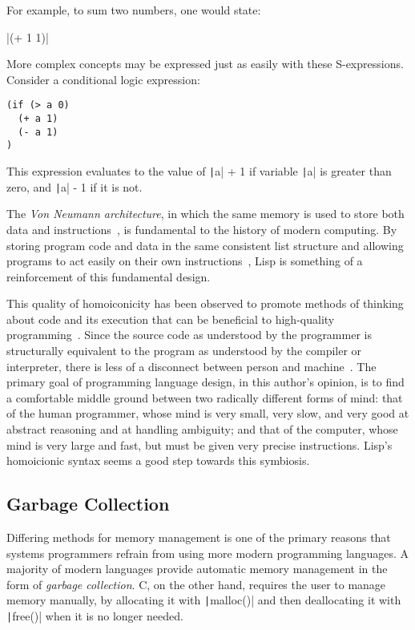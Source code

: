 \documentclass[11pt,a4paper]{article}
\theoremstyle{break}
\begin{document}
For example, to sum two numbers, one would state:

\begin{center}
|(+ 1 1)|
\end{center}

More complex concepts may be expressed just as easily with these S-expressions. Consider a conditional logic expression:

{\centering
\begin{verbatim}
(if (> a 0)
  (+ a 1)
  (- a 1)
)
\end{verbatim}\par
}

This expression evaluates to the value of \texttt|a| + 1 if variable \texttt|a| is greater than zero, and \texttt|a| - 1 if it is not.

The \textit{Von Neumann architecture}, in which the same memory is used to store both data and instructions~\cite{von1993first}, is fundamental to the history of modern computing. By storing program code and data in the same consistent list structure and allowing programs to act easily on their own instructions~\cite{Smith:1984:RSL:800017.800513}, Lisp is something of a reinforcement of this fundamental design.

This quality of homoiconicity has been observed to promote methods of thinking about code and its execution that can be beneficial to high-quality programming~\cite{sicp,raymond2003become}. Since the source code as understood by the programmer is structurally equivalent to the program as understood by the compiler or interpreter, there is less of a disconnect between person and machine~\cite{sicp}. The primary goal of programming language design, in this author's opinion, is to find a comfortable middle ground between two radically different forms of mind: that of the human programmer, whose mind is very small, very slow, and very good at abstract reasoning and at handling ambiguity; and that of the computer, whose mind is very large and fast, but must be given very precise instructions. Lisp's homoicionic syntax seems a good step towards this symbiosis.

\subsection{Garbage Collection}\label{subsec:gc}

Differing methods for memory management is one of the primary reasons that systems programmers refrain from using more modern programming languages. A majority of modern languages provide automatic memory management in the form of \textit{garbage collection}. C, on the other hand, requires the user to manage memory manually, by allocating it with \texttt|malloc()| and then deallocating it with \texttt|free()| when it is no longer needed.
\end{document}
